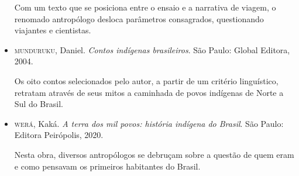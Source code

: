 \documentclass[12pt]{extarticle}
\begin{document}
\begin{itemize}
Com um texto que se posiciona entre o ensaio e a narrativa de viagem, o
renomado antropólogo desloca parâmetros consagrados, questionando
viajantes e cientistas.


\item\textsc{munduruku}, Daniel. \emph{Contos indígenas brasileiros}. São Paulo:
Global Editora, 2004.

Os oito contos selecionados pelo autor, a partir de um critério
linguístico, retratam através de seus mitos a caminhada de povos
indígenas de Norte a Sul do Brasil.


\item\textsc{werá}, Kaká. \emph{A terra dos mil povos: história indígena do Brasil}. São
Paulo: Editora Peirópolis, 2020.

Nesta obra, diversos antropólogos se debruçam sobre a questão de quem
eram e como pensavam os primeiros habitantes do Brasil.
\end{itemize}
\end{document}
